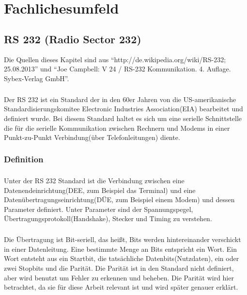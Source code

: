 \chapter{Fachlichesumfeld}\label{chp:fachlichesumfeld}

\section{RS 232 (Radio Sector 232)}

Die Quellen dieses Kapitel sind aus "`http://de.wikipedia.org/wiki/RS-232; 25.08.2013"' und "`Joe Campbell: V 24 / RS-232 Kommunikation. 4. Auflage. Sybex-Verlag GmbH"'.

\paragraph{}
Der RS 232 ist ein Standard der in den 60er Jahren von die US-amerikanische Standardisierungskomitee Electronic Industries Association(EIA) bearbeitet und definiert wurde. Bei diesem Standard haltet es sich um eine serielle Schnittstelle die für die serielle Kommunikation zwischen Rechnern und Modems in einer Punkt-zu-Punkt Verbindung(über Telefonleitungen) diente.


\subsection{Definition}
\paragraph{}
Unter der RS 232 Standard ist die Verbindung zwischen eine Datenendeinrichtung(DEE, zum Beispiel das Terminal) und eine Datenübertragungseinrichtung(DÜE, zum Beispiel einem Modem) und dessen Parameter definiert. Unter Parameter sind der Spannungspegel, Übertragungsprotokoll(Handshake), Stecker und Timing zu verstehen.

\paragraph{}
Die Übertragung ist Bit-seriell, das heißt, Bits werden hintereinander verschickt in einer Datenleitung. Eine bestimmte Menge an Bits entspricht ein Wort. Ein Wort entsteht aus ein Startbit, die tatsächliche Datenbits(Nutzdaten), ein oder zwei Stopbits und die Parität. Die Parität ist in den Standard nicht definiert, aber wird benutzt um Fehler zu erkennen und beheben. Die Parität wird hier betrachtet, da sie für diese Arbeit relevant ist und wird später genauer erklärt.

